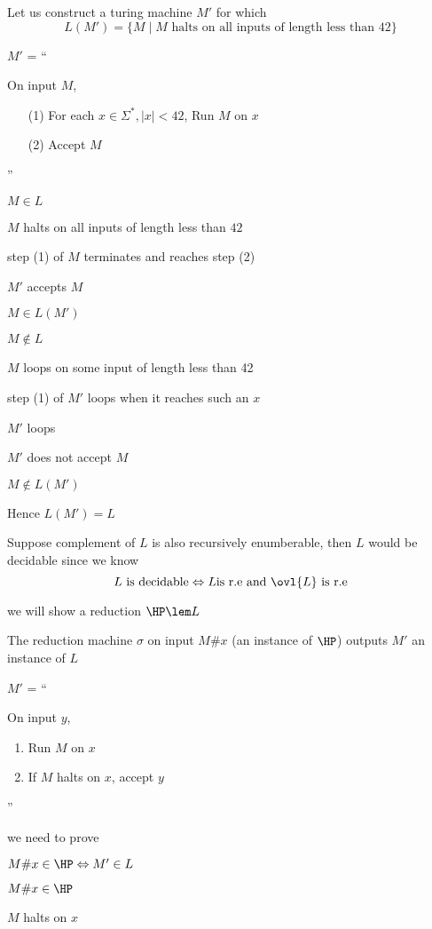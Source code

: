 

Let us construct a turing machine $M'$ for which $$L(M') = \{{
    M \mid M \text{ halts on all inputs of length less than 42}
}\}$$

$M'$ = ``

On input $M$,
\begin{enumerate}
    \item[(1)] For each $x \in \Sigma^*, |x| < 42$, Run $M$ on $x$
    \item[(2)] Accept $M$ 
\end{enumerate}

''

$M \in L$

\imp
$M$ halts on all inputs of length less than $42$

\imp
step (1) of $M$ terminates and reaches step (2)

\imp
$M'$ accepts $M$

\imp
$M \in L(M')$


$M \notin L$

\imp
$M$ loops on some input of length less than 42

\imp
step (1) of $M'$ loops when it reaches such an $x$

\imp
$M'$ loops

\imp
$M'$ does not accept $M$

\imp
$M \notin L(M')$

Hence $L(M') = L$

Suppose complement of $L$ is also recursively enumberable, then $L$ would be decidable since we know 
$$
L \text{ is decidable} \Leftrightarrow L \text{is r.e and $\ovl{L}$ is r.e}
$$

we will show a reduction $\HP \lem L$

The reduction machine $\sigma$ on input $M\#x$ (an instance of $\HP$) outputs $M'$ an instance of $L$

$M'$ = ``

On input $y$,
\begin{enumerate}
    \item Run $M$ on $x$
    \item If $M$ halts on $x$, accept $y$
\end{enumerate}

''

we need to prove

$M\#x \in \HP \Leftrightarrow M' \in L $

$M\#x \in \HP$

\imp
$M$ halts on $x$

